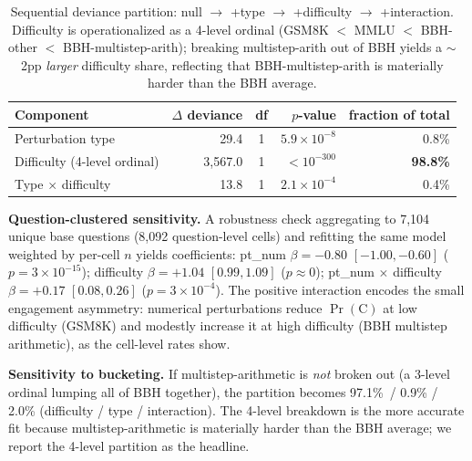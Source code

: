 \documentclass[10pt]{article} %
\begin{document}
\begin{table}[ht]
\caption{Sequential deviance partition: null $\to$ +type $\to$ +difficulty $\to$ +interaction. Difficulty is operationalized as a 4-level ordinal (GSM8K $<$ MMLU $<$ BBH-other $<$ BBH-multistep-arith); breaking multistep-arith out of BBH yields a $\sim$2pp \emph{larger} difficulty share, reflecting that BBH-multistep-arith is materially harder than the BBH average.}
\label{tab:variance_decomp_app}
\begin{center}
\scriptsize
\setlength{\tabcolsep}{8pt}
\begin{tabular}{lrcrr}
\toprule
\textbf{Component} & \textbf{$\Delta$ deviance} & \textbf{df} & \textbf{$p$-value} & \textbf{fraction of total} \\
\midrule
Perturbation type             & 29.4      & 1 & $5.9\times10^{-8}$ & 0.8\% \\
Difficulty (4-level ordinal)  & 3{,}567.0 & 1 & ${<}10^{-300}$     & \textbf{98.8\%} \\
Type $\times$ difficulty      & 13.8      & 1 & $2.1\times10^{-4}$ & 0.4\% \\
\bottomrule
\end{tabular}
\end{center}
\end{table}

\textbf{Question-clustered sensitivity.} A robustness check aggregating to 7{,}104 unique base questions (8{,}092 question-level cells) and refitting the same model weighted by per-cell $n$ yields coefficients: pt\_num $\beta = -0.80$ $[-1.00, -0.60]$ ($p = 3\times10^{-15}$); difficulty $\beta = +1.04$ $[0.99, 1.09]$ ($p \approx 0$); pt\_num $\times$ difficulty $\beta = +0.17$ $[0.08, 0.26]$ ($p = 3\times10^{-4}$). The positive interaction encodes the small engagement asymmetry: numerical perturbations reduce $\Pr(\text{C})$ at low difficulty (GSM8K) and modestly increase it at high difficulty (BBH multistep arithmetic), as the cell-level rates show.

\textbf{Sensitivity to bucketing.} If multistep-arithmetic is \emph{not} broken out (a 3-level ordinal lumping all of BBH together), the partition becomes 97.1\%~/ 0.9\% / 2.0\% (difficulty / type / interaction). The 4-level breakdown is the more accurate fit because multistep-arithmetic is materially harder than the BBH average; we report the 4-level partition as the headline.
\end{document}
